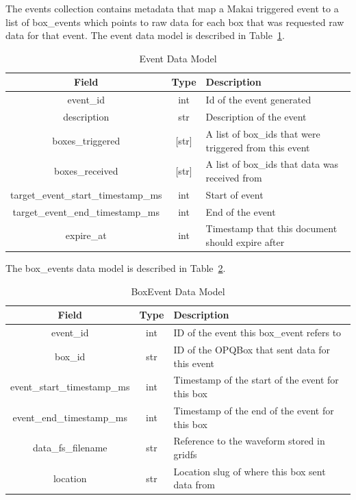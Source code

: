 The events collection contains metadata that map a Makai triggered event to a list of box\_events which points to raw data for each box that was requested raw data for that event. The event data model is described in Table~\ref{table:Events}.

\begin{table}[H]
	\centering
	\caption{Event Data Model}
	\begin{tabular}{|c|c|p{8cm}|}
		\hline
		Field & Type & Description \\
		\hline
		event\_id & int & Id of the event generated \\
		\hline
		description & str & Description of the event \\
		\hline
		boxes\_triggered & [str] & A list of box\_ids that were triggered from this event \\
		\hline
		boxes\_received & [str] & A list of box\_ids that data was received from \\
		\hline
		target\_event\_start\_timestamp\_ms & int & Start of event \\
		\hline
		target\_event\_end\_timestamp\_ms & int & End of the event \\
		\hline
		expire\_at & int & Timestamp that this document should expire after \\
		\hline
	\end{tabular}
	\label{table:Events}
\end{table}

The box\_events data model is described in Table~\ref{table:BoxEvents}.

\begin{table}[H]
	\centering
	\caption{BoxEvent Data Model}
	\begin{tabular}{|c|c|p{8cm}|}
		\hline
		Field & Type & Description \\
		\hline
		event\_id & int & ID of the event this box\_event refers to \\
		\hline
		box\_id & str & ID of the OPQBox that sent data for this event \\
		\hline
		event\_start\_timestamp\_ms & int & Timestamp of the start of the event for this box \\
		\hline
		event\_end\_timestamp\_ms & int & Timestamp of the end of the event for this box \\
		\hline
		data\_fs\_filename & str & Reference to the waveform stored in gridfs \\
		\hline
		location & str & Location slug of where this box sent data from \\
		\hline
	\end{tabular}
	\label{table:BoxEvents}
\end{table}

